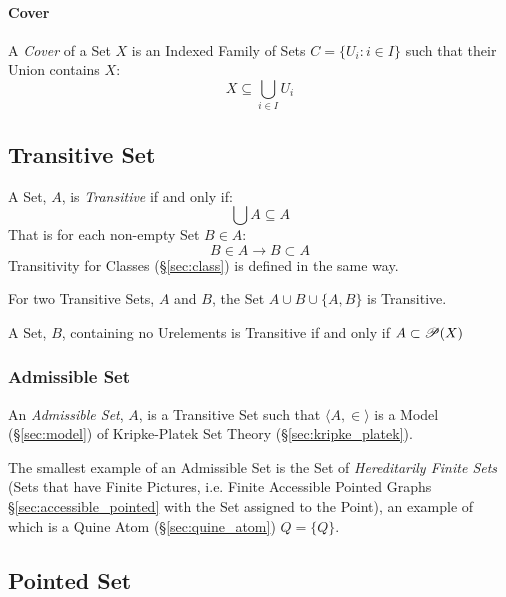 \paragraph{Cover}\label{sec:cover}\hfill

A \emph{Cover} of a Set $X$ is an Indexed Family of Sets $C = \{ U_i :
i \in I \}$ such that their Union contains $X$:
\[
  X \subseteq \bigcup_{i \in I} U_i
\]



\subsection{Transitive Set}\label{sec:transitive_set}

A Set, $A$, is \emph{Transitive} if and only if:
\[
  \bigcup A \subseteq A
\]
That is for each non-empty Set $B \in A$:
\[
  B \in A \to B \subset A
\]
Transitivity for Classes (\S\ref{sec:class}) is defined in the same
way.

For two Transitive Sets, $A$ and $B$, the Set $A \cup B \cup \{A,B\}$
is Transitive.

A Set, $B$, containing no Urelements is Transitive if and only if $A
\subset \mathscr{P}(X)$



\subsubsection{Admissible Set}\label{sec:admissible_set}

An \emph{Admissible Set}, $A$, is a Transitive Set such that $\langle A, \in
\rangle$ is a Model (\S\ref{sec:model}) of Kripke-Platek Set Theory
(\S\ref{sec:kripke_platek}).

The smallest example of an Admissible Set is the Set of \emph{Hereditarily
  Finite Sets} (Sets that have Finite Pictures, i.e. Finite Accessible Pointed
Graphs \S\ref{sec:accessible_pointed} with the Set assigned to the Point), an
example of which is a Quine Atom (\S\ref{sec:quine_atom}) $Q = \{Q\}$.
\cite{aczel88} %



\subsection{Pointed Set}\label{sec:pointed_set}

